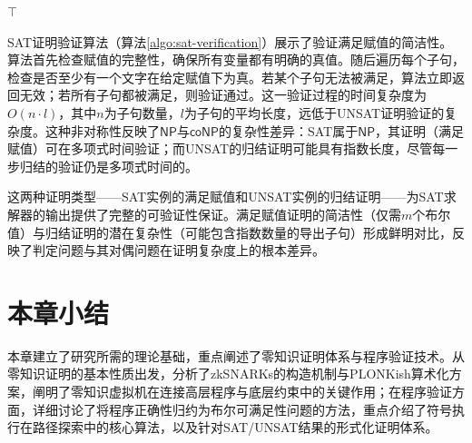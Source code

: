     \begin{algorithm}[H]
        \SetAlgoLined
        \label{algo:sat-verification}
        
        
        
        \KwRet $\top$\;
    \end{algorithm}
    
    SAT证明验证算法（算法\ref{algo:sat-verification}）展示了验证满足赋值的简洁性。算法首先检查赋值的完整性，确保所有变量都有明确的真值。随后遍历每个子句，检查是否至少有一个文字在给定赋值下为真。若某个子句无法被满足，算法立即返回无效；若所有子句都被满足，则验证通过。这一验证过程的时间复杂度为$O(n \cdot l)$，其中$n$为子句数量，$l$为子句的平均长度，远低于UNSAT证明验证的复杂度。这种非对称性反映了$\mathsf{NP}$与$\mathsf{coNP}$的复杂性差异：SAT属于$\mathsf{NP}$，其证明（满足赋值）可在多项式时间验证；而UNSAT的归结证明可能具有指数长度，尽管每一步归结的验证仍是多项式时间的。
    
    这两种证明类型——SAT实例的满足赋值和UNSAT实例的归结证明——为SAT求解器的输出提供了完整的可验证性保证。满足赋值证明的简洁性（仅需$m$个布尔值）与归结证明的潜在复杂性（可能包含指数数量的导出子句）形成鲜明对比，反映了判定问题与其对偶问题在证明复杂度上的根本差异。

\section{本章小结}
本章建立了研究所需的理论基础，重点阐述了零知识证明体系与程序验证技术。从零知识证明的基本性质出发，分析了zkSNARKs的构造机制与PLONKish算术化方案，阐明了零知识虚拟机在连接高层程序与底层约束中的关键作用；在程序验证方面，详细讨论了将程序正确性归约为布尔可满足性问题的方法，重点介绍了符号执行在路径探索中的核心算法，以及针对SAT/UNSAT结果的形式化证明体系。
